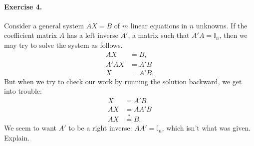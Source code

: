 \documentclass[11pt]{report}
\theoremstyle{remark}
\begin{document}
    \paragraph{Exercise 4.} Consider a general system $AX = B$ of $m$ linear
    equations in $n$ unknowns. If the coefficient matrix $A$ has a left inverse
    $A'$, a matrix such that $A'A = \mathbb{I}_n$, then we may try to solve the
    system as follows. \begin{align*}
        AX &= B, \\
        A'AX &= A'B \\
        X &= A'B.
    \end{align*}
    But when we try to check our work by running the solution backward, we get into
    trouble: \begin{align*}
        X &= A'B \\
        AX &= A A' B \\
        AX &\stackrel{?}{=} B.
    \end{align*}
    We seem to want $A'$ to be a right inverse: $A A' = \mathbb{I}_n$, which isn't
    what was given. Explain.
\end{document}
